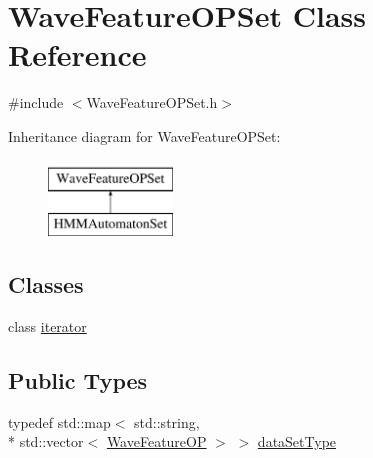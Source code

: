 \hypertarget{class_wave_feature_o_p_set}{\section{Wave\+Feature\+O\+P\+Set Class Reference}
\label{class_wave_feature_o_p_set}
}


{\ttfamily \#include $<$Wave\+Feature\+O\+P\+Set.\+h$>$}

Inheritance diagram for Wave\+Feature\+O\+P\+Set\+:\begin{figure}[H]
\begin{center}
\leavevmode
\includegraphics[height=2.000000cm]{class_wave_feature_o_p_set}
\end{center}
\end{figure}
\subsection*{Classes}
\begin{DoxyCompactItemize}
\item 
class \hyperlink{class_wave_feature_o_p_set_1_1iterator}{iterator}
\end{DoxyCompactItemize}
\subsection*{Public Types}
\begin{DoxyCompactItemize}
\item 
typedef std\+::map$<$ std\+::string, \\*
std\+::vector$<$ \hyperlink{class_wave_feature_o_p}{Wave\+Feature\+O\+P} $>$ $>$ \hyperlink{class_wave_feature_o_p_set_a7145e9463a1fb85ce4c239552bf4e8e0}{data\+Set\+Type}
\end{DoxyCompactItemize}
